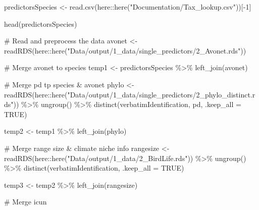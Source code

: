 \documentclass[
  letterpaper,
  DIV=11,
  numbers=noendperiod]{scrreprt}
\newenvironment{Shaded}{\begin{snugshade}}{\end{snugshade}}
\newcommand{\AttributeTok}[1]{\textcolor[rgb]{0.40,0.45,0.13}{#1}}
\newcommand{\CommentTok}[1]{\textcolor[rgb]{0.37,0.37,0.37}{#1}}
\newcommand{\ConstantTok}[1]{\textcolor[rgb]{0.56,0.35,0.01}{#1}}
\newcommand{\DecValTok}[1]{\textcolor[rgb]{0.68,0.00,0.00}{#1}}
\newcommand{\FunctionTok}[1]{\textcolor[rgb]{0.28,0.35,0.67}{#1}}
\newcommand{\NormalTok}[1]{\textcolor[rgb]{0.00,0.23,0.31}{#1}}
\newcommand{\OtherTok}[1]{\textcolor[rgb]{0.00,0.23,0.31}{#1}}
\newcommand{\SpecialCharTok}[1]{\textcolor[rgb]{0.37,0.37,0.37}{#1}}
\newcommand{\StringTok}[1]{\textcolor[rgb]{0.13,0.47,0.30}{#1}}
\begin{document}
\begin{Shaded}
\begin{Highlighting}[]
\NormalTok{predictorsSpecies }\OtherTok{\textless{}{-}} \FunctionTok{read.csv}\NormalTok{(here}\SpecialCharTok{::}\FunctionTok{here}\NormalTok{(}\StringTok{"Documentation/Tax\_lookup.csv"}\NormalTok{))[}\SpecialCharTok{{-}}\DecValTok{1}\NormalTok{]}

\FunctionTok{head}\NormalTok{(predictorsSpecies)}

\CommentTok{\# Read and preprocess the data}
\NormalTok{avonet }\OtherTok{\textless{}{-}} \FunctionTok{readRDS}\NormalTok{(here}\SpecialCharTok{::}\FunctionTok{here}\NormalTok{(}\StringTok{"Data/output/1\_data/single\_predictors/2\_Avonet.rds"}\NormalTok{))}

\CommentTok{\# Merge avonet to species }
\NormalTok{temp1 }\OtherTok{\textless{}{-}}\NormalTok{ predictorsSpecies }\SpecialCharTok{\%\textgreater{}\%}
  \FunctionTok{left\_join}\NormalTok{(avonet)}



\CommentTok{\# Merge pd tp species \& avonet}
\NormalTok{phylo }\OtherTok{\textless{}{-}} \FunctionTok{readRDS}\NormalTok{(here}\SpecialCharTok{::}\FunctionTok{here}\NormalTok{(}\StringTok{"Data/output/1\_data/single\_predictors/2\_phylo\_distinct.rds"}\NormalTok{)) }\SpecialCharTok{\%\textgreater{}\%}
  \FunctionTok{ungroup}\NormalTok{() }\SpecialCharTok{\%\textgreater{}\%}
  \FunctionTok{distinct}\NormalTok{(verbatimIdentification, pd, }\AttributeTok{.keep\_all =} \ConstantTok{TRUE}\NormalTok{)}

\NormalTok{temp2 }\OtherTok{\textless{}{-}}\NormalTok{ temp1 }\SpecialCharTok{\%\textgreater{}\%} \FunctionTok{left\_join}\NormalTok{(phylo)}



\CommentTok{\# Merge range size \& climate niche info}
\NormalTok{rangesize }\OtherTok{\textless{}{-}} \FunctionTok{readRDS}\NormalTok{(here}\SpecialCharTok{::}\FunctionTok{here}\NormalTok{(}\StringTok{"Data/output/1\_data/2\_BirdLife.rds"}\NormalTok{)) }\SpecialCharTok{\%\textgreater{}\%}
  \FunctionTok{ungroup}\NormalTok{() }\SpecialCharTok{\%\textgreater{}\%}
  \FunctionTok{distinct}\NormalTok{(verbatimIdentification, }\AttributeTok{.keep\_all =} \ConstantTok{TRUE}\NormalTok{) }

\NormalTok{temp3 }\OtherTok{\textless{}{-}}\NormalTok{ temp2 }\SpecialCharTok{\%\textgreater{}\%}
  \FunctionTok{left\_join}\NormalTok{(rangesize) }


\CommentTok{\# Merge icun}


\end{Highlighting}
\end{Shaded}
\end{document}

